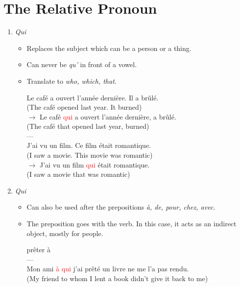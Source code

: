 \documentclass{book}
\begin{document}
    \section{The Relative Pronoun}
        \begin{enumerate}
            \item \textit{Qui}
                \begin{itemize}
                    \item Replaces the subject which can be a person or a thing.
                    \item Can never be \textit{qu'} in front of a vowel.
                    \item Translate to \textit{who, which, that}.
                    \begin{center}
                        Le café a ouvert l'année dernière. Il a brûlé. \\
                        (The café opened last year. It burned) \\
                        $\to$ Le café \textcolor{red}{qui} a ouvert l'année dernière, a brûlé. \\
                        (The café that opened last year, burned) \\
                        --- \\
                        J'ai vu un film. Ce film était romantique. \\
                        (I saw a movie. This movie was romantic) \\
                        $\to$ J'ai vu un film \textcolor{red}{qui} était romantique. \\
                        (I saw a movie that was romantic)
                    \end{center}
                \end{itemize}
            \item \textit{Qui}
                \begin{itemize}
                    \item Can also be used after the prepositions \textit{à, de, pour, chez, avec}.
                    \item The preposition goes with the verb. In this case, it acts as an indirect object, mostly for people.
                        \begin{center}
                            prêter à \\
                            --- \\
                            Mon ami \textcolor{red}{à qui} j'ai prêté un livre ne me l'a pas rendu. \\
                            (My friend to whom I lent a book didn't give it back to me) \\
                        \end{center}
                \end{itemize}


\end{enumerate}
\end{document}
